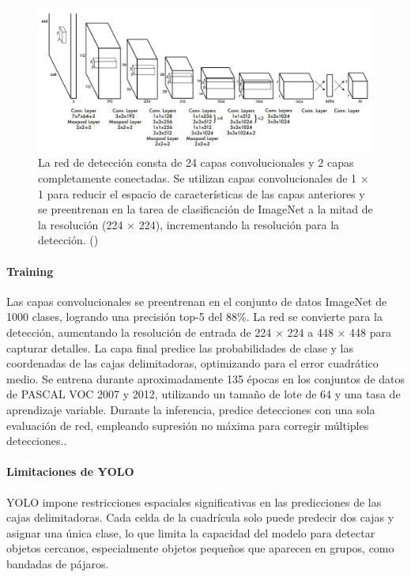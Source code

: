   \begin{figure}[H]
	\begin{center}
		\includegraphics[width=1\textwidth]{2/figures/yolo3.jpeg}
		\caption{La red de detección consta de 24 capas convolucionales y 2 capas completamente conectadas. Se utilizan capas convolucionales de 1 × 1 para reducir el espacio de características de las capas anteriores y se preentrenan en la tarea de clasificación de ImageNet a la mitad de la resolución (224 × 224), incrementando la resolución para la detección. (\cite{tecnica4})}
	\end{center}
\end{figure}
 
\paragraph{Training} 
Las capas convolucionales se preentrenan en el conjunto de datos ImageNet de 1000 clases, logrando una precisión top-5 del 88\%. La red se convierte para la detección, aumentando la resolución de entrada de 224 × 224 a 448 × 448 para capturar detalles. La capa final predice las probabilidades de clase y las coordenadas de las cajas delimitadoras, optimizando para el error cuadrático medio. Se entrena durante aproximadamente 135 épocas en los conjuntos de datos de PASCAL VOC 2007 y 2012, utilizando un tamaño de lote de 64 y una tasa de aprendizaje variable. Durante la inferencia, predice detecciones con una sola evaluación de red, empleando supresión no máxima para corregir múltiples detecciones..

\paragraph{Limitaciones de YOLO}
YOLO impone restricciones espaciales significativas en las predicciones de las cajas delimitadoras. Cada celda de la cuadrícula solo puede predecir dos cajas y asignar una única clase, lo que limita la capacidad del modelo para detectar objetos cercanos, especialmente objetos pequeños que aparecen en grupos, como bandadas de pájaros.

